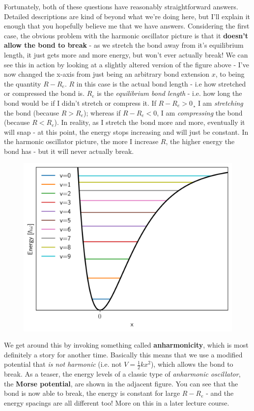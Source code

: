 \documentclass{memoir}[11pt,oneside,a4paper,openany]
\begin{document}
Fortunately, both of these questions have reasonably straightforward answers. Detailed descriptions are kind of beyond what we're doing here, but I'll explain it enough that you hopefully believe me that we have answers. Considering the first case, the obvious problem with the harmonic oscillator picture is that it \textbf{doesn't allow the bond to break} - as we stretch the bond away from it's equilibrium length, it just gets more and more energy, but won't ever actually break! We can see this in action by looking at a slightly altered version of the figure above - I've now changed the x-axis from just being an arbitrary bond extension $x$, to being the quantity $R-R_e$. $R$ in this case is the actual bond length - i.e how stretched or compressed the bond is. $R_e$ is the \emph{equilibrium bond length} - i.e. how long the bond would be if I didn't stretch or compress it. If $R-R_e > 0$¸ I am \emph{stretching} the bond (because $R>R_e$); whereas if $R-R_e < 0$, I am \emph{compressing} the bond (because $R<R_e$). In reality, as I stretch the bond more and more, eventually it will snap - at this point, the energy stops increasing and will just be constant. In the harmonic oscillator picture, the more I increase $R$, the higher energy the bond has - but it will never actually break.

\begin{figure}
\centering
	\includegraphics[width=\linewidth]{morse_potential_gina}
\end{figure}
We get around this by invoking something called \textbf{anharmonicity}, which is most definitely a story for another time. Basically this means that we use a modified potential that \emph{is not harmonic} (i.e. not $V=\frac{1}{2}kx^2$), which allows the bond to break. As a teaser, the energy levels of a classic type of \emph{anharmonic oscillator}, the \textbf{Morse potential}, are shown in the adjacent figure. You can see that the bond is now able to break, the energy is constant for large $R-R_e$ - and the energy spacings are all different too! More on this in a later lecture course.
\end{document}
